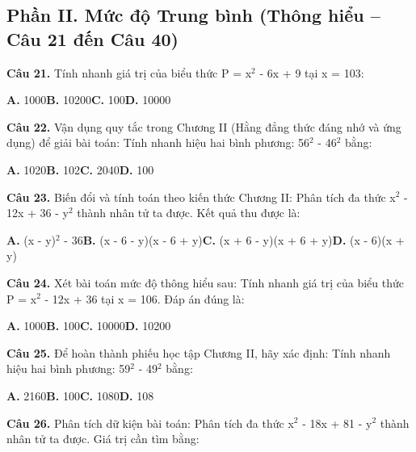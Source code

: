\documentclass[11pt,a4paper]{article}
\begin{document}
\subsection*{\color{accent} Phần II. Mức độ Trung bình (Thông hiểu -- Câu 21 đến Câu 40)}
\textbf{\color{primary} Câu 21.} Tính nhanh giá trị của biểu thức P = x$^2$ - 6x + 9 tại x = 103:\par
\hspace*{1.5em}\textbf{A.} 1000\quad\quad \textbf{B.} 10200\quad\quad \textbf{C.} 100\quad\quad \textbf{D.} 10000\par\vspace{2pt}
\textbf{\color{primary} Câu 22.} Vận dụng quy tắc trong Chương II (Hằng đẳng thức đáng nhớ và ứng dụng) để giải bài toán: Tính nhanh hiệu hai bình phương: 56$^2$ - 46$^2$ bằng:\par
\hspace*{1.5em}\textbf{A.} 1020\quad\quad \textbf{B.} 102\quad\quad \textbf{C.} 2040\quad\quad \textbf{D.} 100\par\vspace{2pt}
\textbf{\color{primary} Câu 23.} Biến đổi và tính toán theo kiến thức Chương II: Phân tích đa thức x$^2$ - 12x + 36 - y$^2$ thành nhân tử ta được. Kết quả thu được là:\par
\hspace*{1.5em}\textbf{A.} (x - y)$^2$ - 36\quad\quad \textbf{B.} (x - 6 - y)(x - 6 + y)\quad\quad \textbf{C.} (x + 6 - y)(x + 6 + y)\quad\quad \textbf{D.} (x - 6)(x + y)\par\vspace{2pt}
\textbf{\color{primary} Câu 24.} Xét bài toán mức độ thông hiểu sau: Tính nhanh giá trị của biểu thức P = x$^2$ - 12x + 36 tại x = 106. Đáp án đúng là:\par
\hspace*{1.5em}\textbf{A.} 1000\quad\quad \textbf{B.} 100\quad\quad \textbf{C.} 10000\quad\quad \textbf{D.} 10200\par\vspace{2pt}
\textbf{\color{primary} Câu 25.} Để hoàn thành phiếu học tập Chương II, hãy xác định: Tính nhanh hiệu hai bình phương: 59$^2$ - 49$^2$ bằng:\par
\hspace*{1.5em}\textbf{A.} 2160\quad\quad \textbf{B.} 100\quad\quad \textbf{C.} 1080\quad\quad \textbf{D.} 108\par\vspace{2pt}
\textbf{\color{primary} Câu 26.} Phân tích dữ kiện bài toán: Phân tích đa thức x$^2$ - 18x + 81 - y$^2$ thành nhân tử ta được. Giá trị cần tìm bằng:\par
\end{document}
